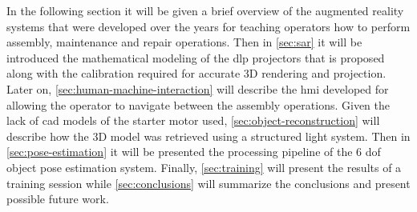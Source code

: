 In the following section it will be given a brief overview of the augmented reality systems that were developed over the years for teaching operators how to perform assembly, maintenance and repair operations. Then in \cref{sec:sar} it will be introduced the mathematical modeling of the \gls{dlp} projectors that is proposed along with the calibration required for accurate 3D rendering and projection. Later on, \cref{sec:human-machine-interaction} will describe the \gls{hmi} developed for allowing the operator to navigate between the assembly operations. Given the lack of \gls{cad} models of the starter motor used, \cref{sec:object-reconstruction} will describe how the 3D model was retrieved using a structured light system. Then in \cref{sec:pose-estimation} it will be presented the processing pipeline of the 6 \gls{dof} object pose estimation system. Finally, \cref{sec:training} will present the results of a training session while \cref{sec:conclusions} will summarize the conclusions and present possible future work.
